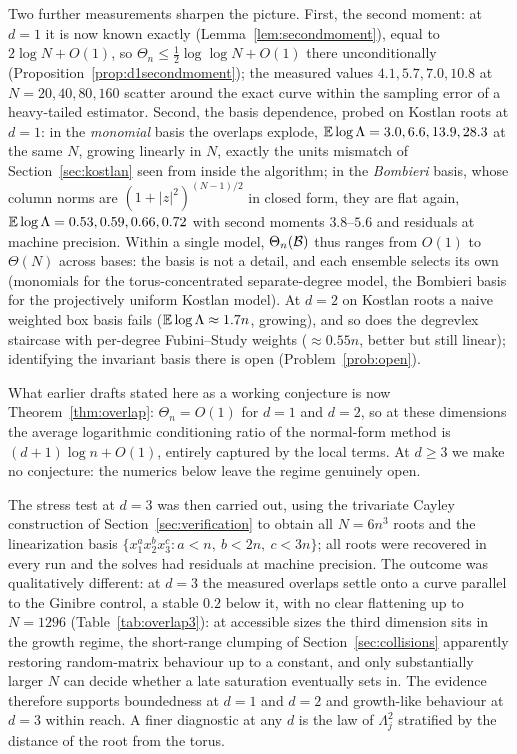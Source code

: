 Two further measurements sharpen the picture. First, the second moment: at $d=1$ it is now
known exactly (Lemma~\ref{lem:secondmoment}), equal to $2\log N+O(1)$, so
$\Theta_n\le\frac12\log\log N+O(1)$ there unconditionally
(Proposition~\ref{prop:d1secondmoment}); the measured values $4.1, 5.7, 7.0, 10.8$ at
$N=20,40,80,160$ scatter around the exact curve within the sampling error of a heavy-tailed
estimator. Second, the basis dependence, probed on Kostlan roots at $d=1$: in the
\emph{monomial} basis the overlaps explode, $\mathbb{E}\log\Lambda = 3.0, 6.6, 13.9, 28.3$ at the
same $N$, growing linearly in $N$, exactly the units mismatch of
Section~\ref{sec:kostlan} seen from inside the algorithm; in the \emph{Bombieri} basis,
whose column norms are $(1+|z|^2)^{(N-1)/2}$ in closed form, they are flat again,
$\mathbb{E}\log\Lambda = 0.53, 0.59, 0.66, 0.72$ with second moments $3.8$--$5.6$ and residuals at
machine precision. Within a single model, $\Theta_n(\mathcal{B})$ thus ranges from $O(1)$ to
$\Theta(N)$ across bases: the basis is not a detail, and each ensemble selects its own
(monomials for the torus-concentrated separate-degree model, the Bombieri basis for the
projectively uniform Kostlan model). At $d=2$ on Kostlan roots a naive weighted box basis
fails ($\mathbb{E}\log\Lambda\approx1.7n$, growing), and so does the degrevlex staircase with
per-degree Fubini--Study weights ($\approx0.55n$, better but still linear); identifying the
invariant basis there is open (Problem~\ref{prob:open}).


What earlier drafts stated here as a working conjecture is now Theorem~\ref{thm:overlap}:
$\Theta_n = O(1)$ for $d=1$ and $d=2$, so at these dimensions the average logarithmic
conditioning ratio of the normal-form method is $(d+1)\log n+O(1)$, entirely captured by
the local terms. At $d\ge3$ we make no conjecture: the numerics below leave the regime
genuinely open.

The stress test at $d=3$ was then carried out, using the trivariate Cayley construction of
Section~\ref{sec:verification} to obtain all $N=6n^3$ roots and the linearization basis
$\{x_1^ax_2^bx_3^c : a<n,\ b<2n,\ c<3n\}$; all roots were recovered in every run and the
solves had residuals at machine precision. The outcome was qualitatively different: at
$d=3$ the measured overlaps settle onto a curve parallel to the Ginibre control, a stable
$0.2$ below it, with no clear flattening up to $N=1296$ (Table~\ref{tab:overlap3}): at
accessible sizes the third dimension sits in the growth regime, the short-range clumping of
Section~\ref{sec:collisions} apparently restoring random-matrix behaviour up to a constant,
and only substantially larger $N$ can decide whether a late saturation eventually sets in.
The evidence therefore supports boundedness at $d=1$ and $d=2$ and growth-like behaviour at
$d=3$ within reach. A finer diagnostic at any $d$ is the law of $\Lambda_j^2$ stratified by
the distance of the root from the torus.


